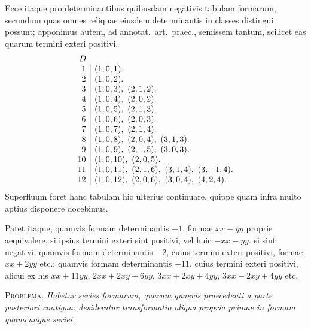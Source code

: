 Ecce itaque pro determinantibus quibusdam negativis tabulam formarum, secundum quas omnes reliquae eiusdem determinantis in classes distingui possunt; apponimus autem, ad annotat.\ art.\ praec., semissem tantum, scilicet eas quarum termini exteri positivi.
\[
\begin{array}{r|l}
\multicolumn{1}{r}{D}&\\
1&(1,0,1).\\
2&(1,0,2).\\
3&(1,0,3),\ (2,1,2).\\
4&(1,0,4),\ (2,0,2).\\
5&(1,0,5),\ (2,1,3).\\
6&(1,0,6),\ (2,0,3).\\
7&(1,0,7),\ (2,1,4).\\
8&(1,0,8),\ (2,0,4),\ (3,1,3).\\
9&(1,0,9),\ (2,1,5),\ (3.\,0,3).\\
10&(1,0,10),\ (2,0,5).\\
11&(1,0,11),\ (2,1,6),\ (3,1,4),\ (3,-1,4).\\
12&(1,0,12),\ (2,0,6),\ (3,0,4),\ (4,2,4).
\end{array}
\]
Superfluum foret hanc tabulam hic ulterius continuare. quippe quam infra multo aptius disponere docebimus.

Patet itaque, quamvis formam determinantis $-1$, formae $xx+yy$ proprie aequivalere, si ipsius termini exteri sint positivi, vel huic $-xx-yy$. si sint negativi; quamvis formam determinantis $-2$, cuius termini exteri positivi, formae $xx+2yy$ etc.; quamvis formam determinantis $-11$, cuius termini exteri positivi, alicui ex his $xx+11yy$, $2xx+2xy+6yy$, $3xx+2xy+4yy$, $3xx-2xy+4yy$ etc.

\textsc{Problema.} \emph{Habetur series formarum, quarum quaevis praecedenti a parte posteriori contigua: desideratur transformatio aliqua propria primae in formam quamcunque seriei.}

